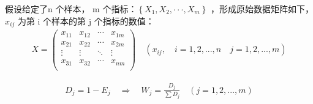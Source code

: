 假设给定了n 个样本， m 个指标：$\left\{ X_{1},X_{2},\cdot\cdot\cdot,X_{m}\right\}$ ，形成原始数据矩阵如下，$x_{ij}$ 为第 i 个样本的第 j 个指标的数值：
\begin{equation}
\begin{aligned}
X=\begin{pmatrix} x_{11} & x_{12} & \cdots & x_{1m} \\ x_{21} & x_{22} & \cdots & x_{2m} \\ \vdots & \vdots & \ddots & \vdots \\ x_{31}& x_{32} & \cdots &x_{nm} \\ \end{pmatrix}\quad (x_{ij},\quad i=1,2,...,n\quad j=1,2,...,m)
  \label{eq:matrix-x}
\end{aligned}
\end{equation}


\begin{equation}
\begin{aligned}
D_j=1-E_j \quad \Rightarrow \quad W_j=\frac{D_j}{\sum D_j}\quad (j=1,2,...,m)
  \label{eq:dj}
\end{aligned}
\end{equation}